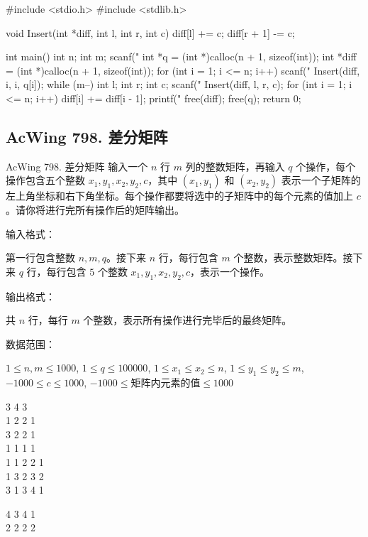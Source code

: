 \begin{mycpptwocol}[差分]
#include <stdio.h>
#include <stdlib.h>

void Insert(int *diff, int l, int r, int c)
{
    diff[l] += c;
    diff[r + 1] -= c;
}

int main()
{
    int n;
    int m;
    scanf("%
    int *q = (int *)calloc(n + 1, sizeof(int));
    int *diff = (int *)calloc(n + 1, sizeof(int));
    for (int i = 1; i <= n; i++) {
        scanf("%
        Insert(diff, i, i, q[i]);
    }
    while (m--) {
        int l;
        int r;
        int c;
        scanf("%
        Insert(diff, l, r, c);
    }
    for (int i = 1; i <= n; i++) {
        diff[i] += diff[i - 1];
        printf("%
    }
    free(diff);
    free(q);
    return 0;
}
\end{mycpptwocol}

\subsection{AcWing 798. 差分矩阵}
\begin{titledbox}{AcWing 798. 差分矩阵}
    输入一个 $n$ 行 $m$ 列的整数矩阵，再输入 $q$ 个操作，每个操作包含五个整数 $x_1, y_1, x_2, y_2, c$，其中 $(x_1, y_1)$ 和 $(x_2, y_2)$ 表示一个子矩阵的左上角坐标和右下角坐标。每个操作都要将选中的子矩阵中的每个元素的值加上 $c$。请你将进行完所有操作后的矩阵输出。

    输入格式：

    第一行包含整数 $n,m,q$。接下来 $n$ 行，每行包含 $m$ 个整数，表示整数矩阵。接下来 $q$ 行，每行包含 $5$ 个整数 $x_1, y_1, x_2, y_2, c$，表示一个操作。

    输出格式：

    共 $n$ 行，每行 $m$ 个整数，表示所有操作进行完毕后的最终矩阵。
    
    数据范围：

    $1 \le n,m \le 1000$, $1 \le q \le 100000$, $1 \le x_1 \le x_2 \le n$, $1 \le y_1 \le y_2 \le m$, $-1000 \le c \le 1000$, $-1000 \le 矩阵内元素的值 \le 1000$

    \begin{inputblock}
        3 4 3 \\
        1 2 2 1 \\
        3 2 2 1 \\
        1 1 1 1 \\
        1 1 2 2 1 \\
        1 3 2 3 2 \\
        3 1 3 4 1
    \end{inputblock}
    \begin{outputblock}
        4 3 4 1 \\
        2 2 2 2
    \end{outputblock}
\end{titledbox}

